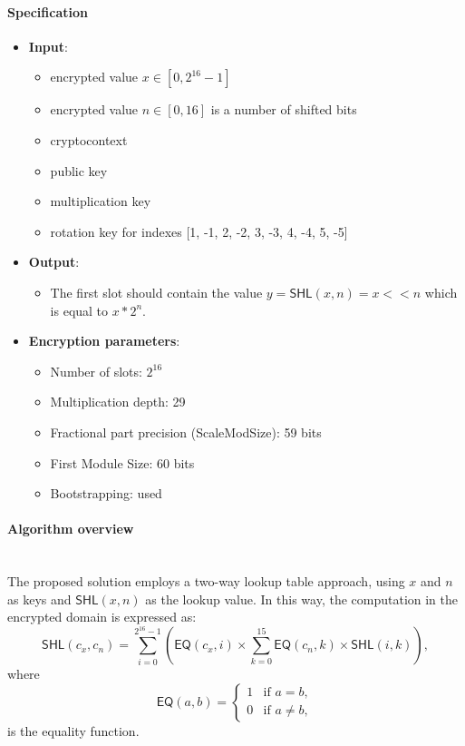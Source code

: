 \documentclass[article]{iacrtrans}
\begin{document}
\paragraph{Specification}
 \begin{itemize}
    \item \textbf{Input}: 
        \begin{itemize}
            \item encrypted value $x \in [0, 2^{16} - 1]$
            \item encrypted value $n \in [0, 16]$ is a number of shifted bits
            \item cryptocontext
            \item public key
            \item multiplication key
            \item rotation key for indexes [1, -1, 2, -2, 3, -3, 4, -4, 5, -5]
        \end{itemize}
    \item \textbf {Output}:
        \begin{itemize}
            \item The first slot should contain the value $y = \textsf{SHL}(x, n) = x << n $ which is equal to $x*2^n$.
        \end{itemize}
    \item \textbf{Encryption parameters}:
        \begin{itemize}
            \item Number of slots: $2^{16}$ 
            \item Multiplication depth: 29
            \item Fractional part precision (ScaleModSize): 59 bits
            \item First Module Size: 60 bits
            \item Bootstrapping: used
        \end{itemize}
\end{itemize}
    
\paragraph{Algorithm overview}\mbox{}\\
        
The proposed solution employs a two-way lookup table approach, using $x$ and $n$ as keys and $\textsf{SHL}(x, n)$ as the lookup value. In this way, the computation in the encrypted domain is expressed as:
\[
    \textsf{SHL}(c_x, c_n) = \sum_{i=0}^{2^{16} - 1} \left( \textsf{EQ}(c_x, i) \times \sum_{k=0}^{15} \textsf{EQ}(c_n, k) \times \textsf{SHL}(i, k) \right),
\]
where
\[
    \textsf{EQ}(a, b) = 
    \begin{cases} 
        1 & \text{if } a = b, \\
        0 & \text{if } a \neq b,
    \end{cases}
\]
is the equality function.
\end{document}
